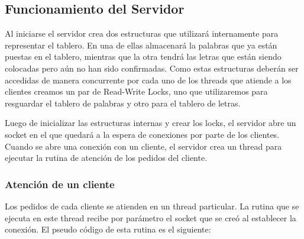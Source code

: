 \documentclass[a4paper,11pt]{article}
\begin{document}
\subsection{Funcionamiento del Servidor}
	Al iniciarse el servidor crea dos estructuras que utilizará internamente para representar el tablero. En una de ellas almacenará la palabras que ya están puestas en el tablero, mientras que la otra tendrá las letras que están siendo colocadas pero aún no han sido confirmadas. Como estas estructuras deberán ser accedidas de manera concurrente por cada uno de los threads que atiende a los clientes creamos un par de Read-Write Locks, uno que utilizaremos para resguardar el tablero de palabras y otro para el tablero de letras.
	
	Luego de inicializar las estructuras internas y crear los locks, el servidor abre un socket en el que quedará a la espera de conexiones por parte de los clientes. Cuando se abre una conexión con un cliente, el servidor crea un thread para ejecutar la rutina de atención de los pedidos del cliente.

\subsubsection{Atención de un cliente}
	Los pedidos de cada cliente se atienden en un thread particular. La rutina que se ejecuta en este thread recibe por parámetro el socket que se creó al establecer la conexión.
	El pseudo código de esta rutina es el siguiente:
	
	
\end{document}
